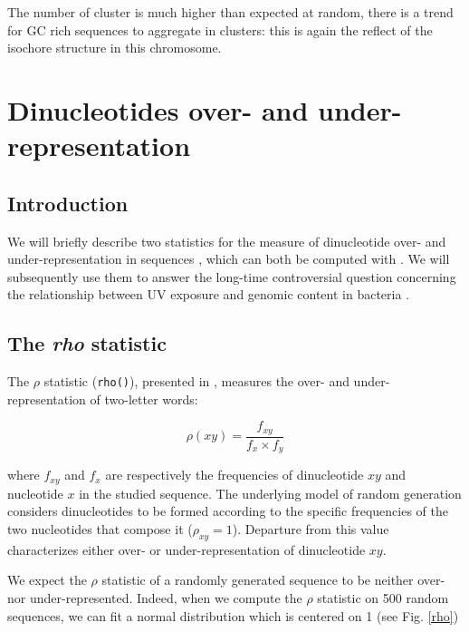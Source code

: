 \documentclass{article}
\begin{document}
The number of cluster is much higher than expected at random, there is a trend for
GC rich sequences to aggregate in clusters: this is again the reflect of the isochore
structure in this chromosome.

\section{Dinucleotides over- and under-representation}
\label{dinu}

\subsection{Introduction}

We will briefly describe two statistics for the measure of
dinucleotide over- and under-representation in sequences
\cite{Karlin,UV}, which can both be computed with \seqinr{}. We will
subsequently use them to answer the long-time controversial question
concerning the relationship between UV exposure and genomic content in
bacteria \cite{Singer,Bak}.

\subsection{The \textit{rho} statistic}

The $\rho$ statistic (\texttt{rho()}), presented in \cite{Karlin},
measures the over- and under-representation of two-letter words:

$$\rho(xy) = \frac{f_{xy}}{f_{x}\times f_{y}}$$

where $f_{xy}$ and $f_{x}$ are respectively the frequencies of
dinucleotide $xy$ and nucleotide $x$ in the studied sequence. The
underlying model of random generation considers dinucleotides to be
formed according to the specific frequencies of the two nucleotides
that compose it ($\rho_{xy} = 1$). Departure from this value
characterizes either over- or under-representation of dinucleotide
$xy$.


We expect the $\rho$ statistic of a randomly generated sequence to be
neither over- nor under-represented. Indeed, when we compute the
$\rho$ statistic on 500 random
sequences, we can fit a normal distribution which is centered on 1
(see Fig. \ref{rho})
\end{document}
